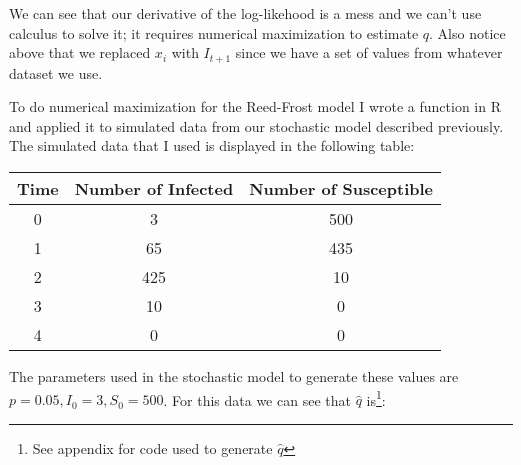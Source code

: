We can see that our derivative of the log-likehood is a mess and we can't use calculus to solve it; it requires numerical maximization to estimate $q$. Also notice above that we replaced $x_i$ with $I_{t+1}$ since we have a set of values from whatever dataset we use.

To do numerical maximization for the Reed-Frost model I wrote a function in R and applied it to simulated data from our stochastic model described previously. The simulated data that I used is displayed in the following table: 

\begin{center}
 \begin{tabular}{||c c c||} 
 \hline
 Time & Number of Infected & Number of Susceptible \\ [0.5ex] 
 \hline\hline
 0 & 3 & 500 \\ 
 \hline
 1 & 65 & 435 \\
 \hline 
 2 & 425 & 10 \\
 \hline
 3 & 10 & 0\\
 \hline
 4 & 0 & 0\\
 \hline
\end{tabular}
\end{center}

 The parameters used in the stochastic model to generate these values are $p=0.05, I_0=3, S_0=500$. For this data we can see that $\hat{q}$ is\footnote{See appendix for code used to generate $\hat{q}$}: 
